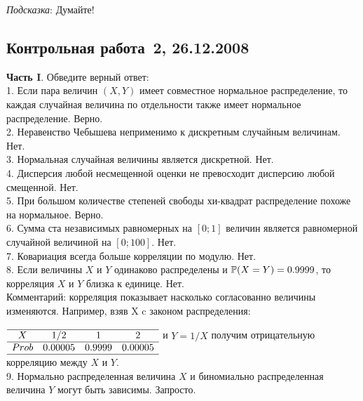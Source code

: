 \documentclass[pdftex,12pt,a4paper]{article}
\begin{document}
\emph{Подсказка}: Думайте! \\

\subsection{Контрольная работа \No\,2, 26.12.2008}

\textbf{Часть I}. Обведите верный ответ: \\

1. Если пара величин $(X,Y)$ имеет совместное нормальное распределение, то каждая случайная величина по отдельности также имеет нормальное распределение. Верно. \\

2. Неравенство Чебышева неприменимо к дискретным случайным величинам. Нет. \\

3. Нормальная случайная величины является дискретной. Нет.
\\

4. Дисперсия любой несмещенной оценки не превосходит дисперсию любой смещенной. Нет. \\

5. При большом количестве степеней свободы хи-квадрат распределение похоже на нормальное. Верно. \\

6. Сумма ста независимых равномерных на $[0;1]$ величин является равномерной случайной величиной на $[0;100]$. Нет. \\

7. Ковариация всегда больше корреляции по модулю.  Нет. \\

8. Если величины $X$ и $Y$ одинаково распределены и $\P(X=Y)=0.9999$, то корреляция $X$ и $Y$ близка к единице. Нет. \\
Комментарий: корреляция показывает насколько согласованно величины изменяются. Например, взяв X c законом распределения: \\
$\begin{array}{cccc} \\
\hline
X & 1/2 & 1 & 2 \\
\hline
Prob & 0.00005 & 0.9999 & 0.00005 \\
\hline
\end{array}$
и $Y=1/X$ получим отрицательную корреляцию между $X$ и $Y$. \\

9. Нормально распределенная величина $X$ и биномиально распределенная величина $Y$ могут быть зависимы. Запросто. \\
\end{document}
